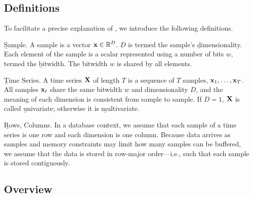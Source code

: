 

\subsection{Definitions}

To facilitate a precise explanation of \minesp, we introduce the following definitions.

\begin{Definition} \b{Sample.} A sample is a vector $\mathbf{x} \in \mathbb{R}^D$. $D$ is termed the sample's \b{dimensionality}. Each element of the sample is a scalar represented using a number of bits $w$, termed the \b{bitwidth}. The bitwidth $w$ is shared by all elements.
\end{Definition}

\begin{Definition} \b{Time Series.} A time series $\mathbf{X}$ of length $T$ is a sequence of $T$ samples, $\mathbf{x}_1,\ldots,\mathbf{x}_T$. All samples $\mathbf{x}_t$ share the same bitwidth $w$ and dimensionality $D$, and the meaning of each dimension is consistent from sample to sample. If $D = 1$, $\mathbf{X}$ is called \b{univariate}; otherwise it is \b{multivariate}.
\end{Definition}

\begin{Definition} \b{Rows, Columns.} In a database context, we assume that each sample of a time series is one row and each dimension is one column. Because data arrives as samples and memory constraints may limit how many samples can be buffered, we assume that the data is stored in row-major order---i.e., such that each sample is stored contiguously.
\end{Definition}

\subsection{Overview}

